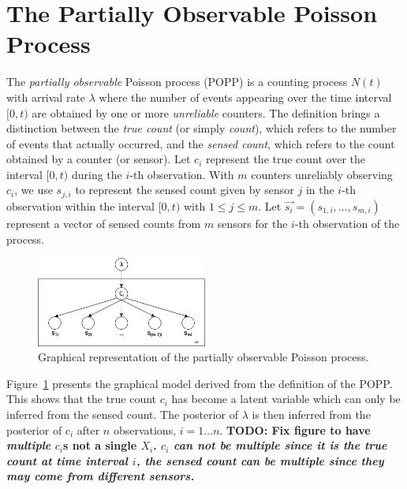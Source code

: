 
\section{The Partially Observable Poisson Process}
\label{sec:popp}

The \emph{partially observable} Poisson process (POPP) is a counting process $N(t)$ with arrival rate $\lambda$ where the number of events appearing over the time interval $[0, t)$ are obtained by one or more \emph{unreliable} counters. 
% 
The definition brings a distinction between the \emph{true count} (or simply \emph{count}), which refers to the number of events that actually occurred, and the \emph{sensed count}, which refers to the count obtained by a counter (or sensor). Let $c_i$ represent the true count over the interval $[0, t)$ during the $i$-th observation. With $m$ counters unreliably observing $c_i$, we use  $s_{j,i}$ to represent the sensed count given by sensor $j$ in the $i$-th observation within the interval $[0, t)$ with $1 \leq j \leq m$. Let $\vec{s_i} = (s_{1,i}, \ldots, s_{m,i})$ represent a vector of sensed counts from $m$ sensors for the $i$-th observation of the process. 
% 


\begin{figure}[t!]
	\centering
	\includegraphics[width=0.5\textwidth]{./figures/gm_popp.jpg}
    \caption{Graphical representation of the partially observable Poisson process.}
	\label{fig:gm_popp}
\end{figure}


Figure~\ref{fig:gm_popp} presents the graphical model derived from the definition of the POPP. This shows that the true count $c_i$ has become a latent variable which can only be inferred from the sensed count.
% 
The posterior of $\lambda$ is then inferred from the posterior of $c_i$ after $n$ observations, $i = 1 \ldots n$. \textbf{TODO: Fix figure to have \emph{multiple} $c_i$s not a single $X_i$. \emph{$c_i$ can not be multiple since it is the true count at time interval $i$, the sensed count can be multiple since they may come from different sensors.}	}

